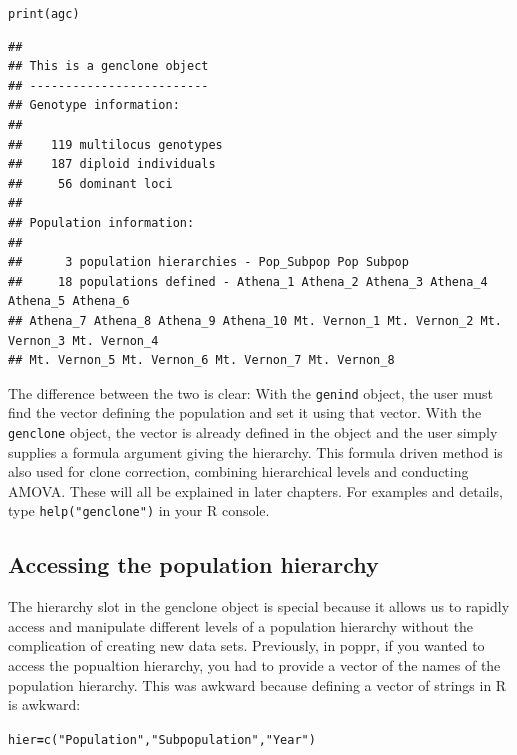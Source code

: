 \documentclass[letterpaper]{article}\usepackage[]{graphicx}\usepackage[]{color}
\makeatletter
\newcommand{\hlstr}[1]{\textcolor[rgb]{0.651,0.522,0}{#1}}%
\newcommand{\hlstd}[1]{\textcolor[rgb]{0,0,0}{#1}}%
\newcommand{\hlkwb}[1]{\textcolor[rgb]{0.502,0.502,0.753}{\textbf{#1}}}%
\newcommand{\hlkwd}[1]{\textcolor[rgb]{0,0.267,0.4}{#1}}%
\newenvironment{kframe}{%
 \def\at@end@of@kframe{}%
 \ifinner\ifhmode%
  \def\at@end@of@kframe{\end{minipage}}%
  \begin{minipage}{\columnwidth}%
 \fi\fi%
 \def\FrameCommand##1{\hskip\@totalleftmargin \hskip-\fboxsep
 \colorbox{shadecolor}{##1}\hskip-\fboxsep
     \hskip-\linewidth \hskip-\@totalleftmargin \hskip\columnwidth}%
 \MakeFramed {\advance\hsize-\width
   \@totalleftmargin\z@ \linewidth\hsize
   \@setminipage}}%
 {\par\unskip\endMakeFramed%
 \at@end@of@kframe}
\newenvironment{knitrout}{}{} %
\makeatother
\begin{document}
\begin{knitrout}
\begin{kframe}
\begin{alltt}
\hlkwd{print}\hlstd{(agc)}
\end{alltt}
\begin{verbatim}
## 
## This is a genclone object
## -------------------------
## Genotype information:
## 
##    119 multilocus genotypes
##    187 diploid individuals
##     56 dominant loci
## 
## Population information:
## 
##      3 population hierarchies - Pop_Subpop Pop Subpop
##     18 populations defined - Athena_1 Athena_2 Athena_3 Athena_4 Athena_5 Athena_6 
## Athena_7 Athena_8 Athena_9 Athena_10 Mt. Vernon_1 Mt. Vernon_2 Mt. Vernon_3 Mt. Vernon_4 
## Mt. Vernon_5 Mt. Vernon_6 Mt. Vernon_7 Mt. Vernon_8
\end{verbatim}
\end{kframe}
\end{knitrout}


The difference between the two is clear: With the \texttt{genind} object, the
user must find the vector defining the population and set it using that vector.
With the \texttt{genclone} object, the vector is already defined in the object
and the user simply supplies a formula argument giving the hierarchy. This 
formula driven method is also used for clone correction, combining hierarchical
levels and conducting AMOVA. These will all be explained in later chapters. For
examples and details, type \texttt{help("genclone")} in your R console.

\subsection{Accessing the population hierarchy}\label{intro:genclone:access}

The hierarchy slot in the genclone object is special because it allows us to
rapidly access and manipulate different levels of a population hierarchy without
the complication of creating new data sets. Previously, in poppr, if you wanted
to access the popualtion hierarchy, you had to provide a vector of the names
of the population hierarchy. This was awkward because defining a vector of
strings in R is awkward:

\begin{knitrout}\footnotesize
{}\color{fgcolor}\begin{kframe}
\begin{alltt}
\hlstd{hier} \hlkwb{=} \hlkwd{c}\hlstd{(}\hlstr{"Population"}\hlstd{,} \hlstr{"Subpopulation"}\hlstd{,} \hlstr{"Year"}\hlstd{)}
\end{alltt}
\end{kframe}
\end{knitrout}
\end{document}
